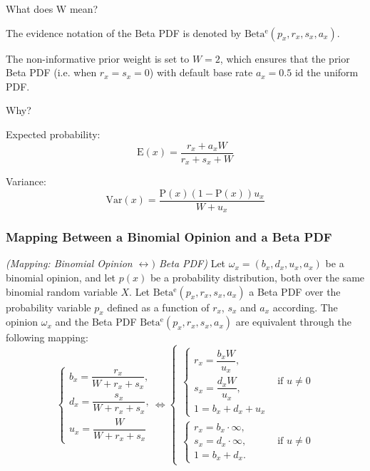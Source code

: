 \begin{question}
	What does W mean?
\end{question}

The evidence notation of the Beta PDF is denoted by $\mathrm{Beta^e}(p_x, r_x, s_x, a_x)$.

The non-informative prior weight is set to $W = 2$, which ensures that the prior Beta PDF (i.e. when $r_x = s_x = 0$) with default base rate $a_x = 0.5$ id the uniform PDF.

\begin{question}
	Why?
\end{question}

Expected probability:
\begin{equation}
	\mathrm{E}(x) = \frac{r_x + a_x W}{r_x + s_x + W}
\end{equation}

Variance:
\begin{equation}
	\mathrm{Var}(x) = \frac{\mathrm{P}(x)(1 - \mathrm{P}(x))u_x}{W + u_x}
\end{equation}

\subsubsection{Mapping Between a Binomial Opinion and a Beta PDF}

\begin{definition}
	\emph{(Mapping: Binomial Opinion $\leftrightarrow)$ Beta PDF)} Let $\omega_x = (b_x, d_x, u_x, a_x)$ be a binomial opinion, and let $p(x)$ be a probability distribution, both over the same binomial random variable $X$. Let $\mathrm{Beta^e}(p_x, r_x, s_x, a_x)$ a Beta PDF over the probability variable $p_x$ defined as a function of $r_x$, $s_x$ and
$a_x$ according. The opinion $\omega_x$ and the Beta PDF $\mathrm{Beta^e}(p_x, r_x, s_x, a_x)$ are
 equivalent through the following mapping:
	\begin{equation}
		\begin{cases}
			b_x = \dfrac{r_x}{W + r_x + s_x}\text{,}\\
			d_x = \dfrac{s_x}{W + r_x + s_x}\text{,}\\
			u_x = \dfrac{W}{W + r_x + s_x}
		\end{cases} \Leftrightarrow
		\begin{cases}
			\begin{cases}
				r_x = \dfrac{b_x W}{u_x}\text{,}\\
				s_x = \dfrac{d_x W}{u_x}\text{,}\\
				1 = b_x + d_x + u_x
			\end{cases} & \text{if } u \neq 0 \\
			\begin{cases}
				r_x = b_x \cdot \infty \text{,}\\
				s_x = d_x \cdot \infty \text{,}\\
				1 = b_x + d_x \text{.}
			\end{cases} & \text{if } u \neq 0
		\end{cases}
	\end{equation}
\end{definition}

